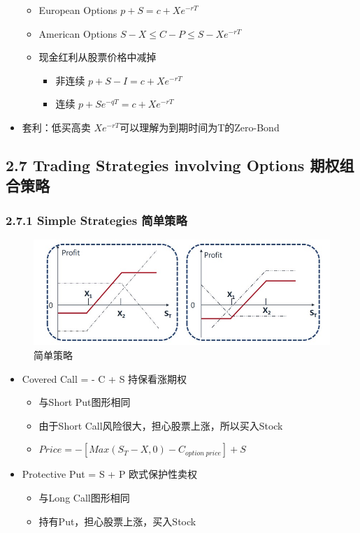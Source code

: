 \documentclass[a4paper,6pt,twoside,openany]{article}
\begin{document}
\begin{itemize}
\begin{itemize}
  \item European Options $p + S = c + Xe^{-rT}$
  \item American Options $S - X \le C - P \le S - Xe^{-rT}$
  \item 现金红利从股票价格中减掉
    \begin{itemize}
    \item 非连续 $p + S - I = c + Xe^{-rT}$
    \item 连续 $p + Se^{-qT} = c + Xe^{-rT}$
    \end{itemize}
  \end{itemize}
  \item 套利：低买高卖 $Xe^{-rT}$可以理解为到期时间为T的Zero-Bond
\end{itemize}

\subsection*{2.7 Trading Strategies involving Options 期权组合策略}
\subsubsection*{2.7.1 Simple Strategies 简单策略}
\begin{figure}[!htbp]
  \centering \includegraphics[width=150mm]{Strategy_Simple.jpg}
  \caption{简单策略}
\end{figure}
\begin{itemize}
\item Covered Call = - C + S 持保看涨期权
  \begin{itemize}
  \item 与Short Put图形相同
  \item 由于Short Call风险很大，担心股票上涨，所以买入Stock
  \item $Price = -[Max(S_T - X,0) - C_{option\ price}] + S$
  \end{itemize}
\item Protective Put = S + P 欧式保护性卖权
  \begin{itemize}
  \item 与Long Call图形相同
  \item 持有Put，担心股票上涨，买入Stock
  \end{itemize}
\end{itemize}
\end{document}
